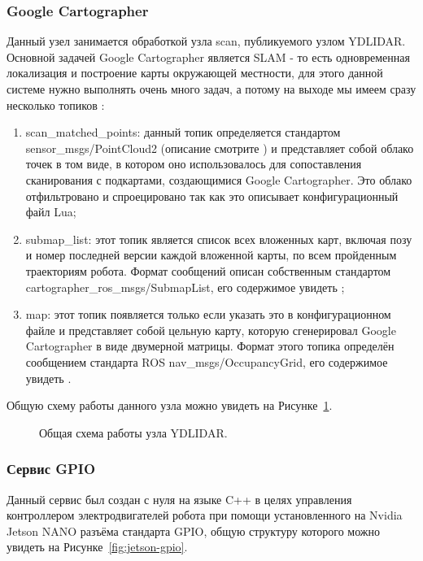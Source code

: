 \subsubsection{Google Cartographer}
Данный узел занимается обработкой узла scan, публикуемого узлом YDLIDAR. Основной задачей Google Cartographer является SLAM - то есть одновременная локализация и построение карты окружающей местности, для этого данной системе нужно выполнять очень много задач, а потому на выходе мы имеем сразу несколько топиков :
\begin{enumerate}
\item scan\_matched\_points: данный топик определяется стандартом sensor\_msgs/PointCloud2 (описание смотрите ) и представляет собой облако точек в том виде, в котором оно использовалось для сопоставления сканирования с подкартами, создающимися Google Cartographer. Это облако отфильтровано и спроецировано так как это описывает конфигурационный файл Lua;
\item submap\_list: этот топик является список всех вложенных карт, включая позу и номер последней версии каждой вложенной карты, по всем пройденным траекториям робота. Формат сообщений описан собственным стандартом cartographer\_ros\_msgs/SubmapList, его содержимое увидеть ;
\item map: этот топик появляется только если указать это в конфигурационном файле и представляет собой цельную карту, которую сгенерировал Google Cartographer в виде двумерной матрицы. Формат этого топика определён сообщением стандарта ROS nav\_msgs/OccupancyGrid, его содержимое увидеть .
\end{enumerate}

Общую схему работы данного узла можно увидеть на Рисунке~\ref{fig:node-cartographer}.

\begin{figure}[ht]
  \caption{Общая схема работы узла YDLIDAR.}\label{fig:node-cartographer}
\end{figure}

\subsubsection{Сервис GPIO}
Данный сервис был создан с нуля на языке C++ в целях управления контроллером электродвигателей робота при помощи установленного на Nvidia Jetson NANO разъёма стандарта GPIO, общую структуру которого можно увидеть на Рисунке~\ref{fig:jetson-gpio}.

